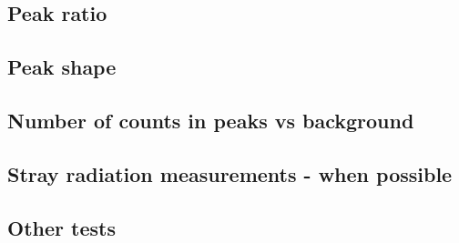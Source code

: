 
\subsection{Peak ratio}
\label{theory:qc:peakratio}



\subsection{Peak shape}
\label{theory:qc:peakshape}


\subsection{Number of counts in peaks vs background}
\label{theory:qc:counts}



\subsection{Stray radiation measurements - when possible}
\label{theory:qc:stray}


\subsection{Other tests}


